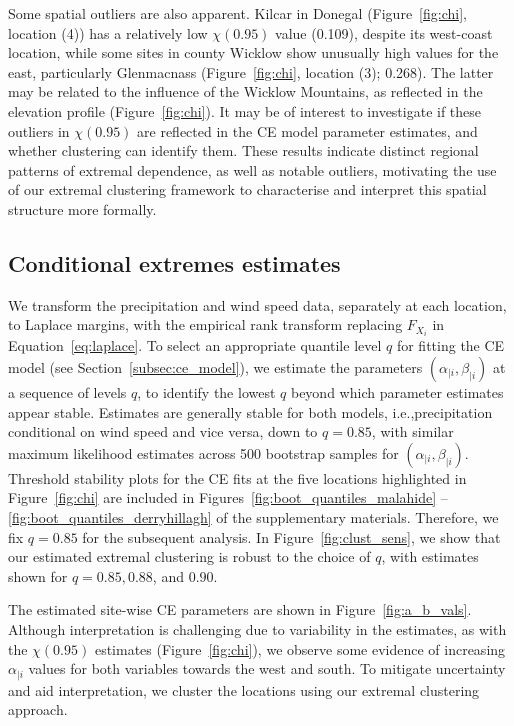 \documentclass[12pt,compact]{article}
\begin{document}
Some spatial outliers are also apparent. 
Kilcar in Donegal (Figure~\ref{fig:chi}, location (4)) has a relatively low $\chi(0.95)$ value (0.109), despite its west-coast location, while some sites in county Wicklow show unusually high values for the east, particularly Glenmacnass (Figure~\ref{fig:chi}, location (3); 0.268).
The latter may be related to the influence of the Wicklow Mountains, as reflected in the elevation profile (Figure~\ref{fig:chi}). 
It may be of interest to investigate if these outliers in $\chi(0.95)$ are reflected in the CE model parameter estimates, and whether clustering can identify them.
These results indicate distinct regional patterns of extremal dependence, as well as notable outliers, motivating the use of our extremal clustering framework to characterise and interpret this spatial structure more formally. 

\subsection{Conditional extremes estimates}
\label{subsec:app_ce}

We transform the precipitation and wind speed data, separately at each location, to Laplace margins, with the empirical rank transform replacing $F_{X_i}$ in Equation~\eqref{eq:laplace}.
To select an appropriate quantile level $q$ for fitting the CE model (see Section~\ref{subsec:ce_model}), we estimate the parameters $(\alpha_{\mid i}, \beta_{\mid i})$ at a sequence of levels $q$, to identify the lowest $q$ beyond which parameter estimates appear stable.
Estimates are generally stable for both models, i.e.,\@ precipitation conditional on wind speed and vice versa, down to $q = 0.85$, with similar maximum likelihood estimates across 500 bootstrap samples for $(\alpha_{\mid i}, \beta_{\mid i})$.
Threshold stability plots for the CE fits at the five locations highlighted in Figure~\ref{fig:chi} are included in Figures~\ref{fig:boot_quantiles_malahide} -- \ref{fig:boot_quantiles_derryhillagh} of the supplementary materials.
Therefore, we fix $q = 0.85$ for the subsequent analysis.
In Figure~\ref{fig:clust_sens}, we show that our estimated extremal clustering is robust to the choice of $q$, with estimates shown for $q = 0.85, 0.88$, and $0.90$.

The estimated site-wise CE parameters are shown in Figure~\ref{fig:a_b_vals}.
Although interpretation is challenging due to variability in the estimates, as with the $\chi(0.95)$ estimates (Figure~\ref{fig:chi}), we observe some evidence of increasing $\alpha_{\mid i}$ values for both variables towards the west and south.
To mitigate uncertainty and aid interpretation, we cluster the locations using our extremal clustering approach. 
\end{document}
